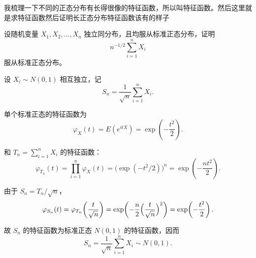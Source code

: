 \begin{dxtips}
    我梳理一下不同的正态分布有长得很像的特征函数，所以叫特征函数。然后这里就是求特征函数然后证明长正态分布特征函数该有的样子
\end{dxtips}
\begin{homework}[4.11]
设随机变量 $X_1,X_2,\ldots,X_n$ 独立同分布，且均服从标准正态分布，证明
\[
n^{-1/2}\sum_{i=1}^n X_i
\]
服从标准正态分布。
\end{homework}
\begin{solution}
设 $X_i\sim N(0,1)$ 相互独立，记
\[
S_n=\frac1{\sqrt{n}}\sum_{i=1}^n X_i.
\]

单个标准正态的特征函数为
\[
\varphi_X(t)=E(e^{itX})=\exp\!\left(-\frac{t^2}{2}\right).
\]

和 $T_n=\sum_{i=1}^n X_i$ 的特征函数：
\[
\varphi_{T_n}(t)
=\prod_{i=1}^n \varphi_X(t)
=\bigl(\exp(-t^2/2)\bigr)^n
=\exp\!\left(-\frac{n t^2}{2}\right).
\]

由于 $S_n = T_n/\sqrt{n}$，
\[
\varphi_{S_n}(t)
=\varphi_{T_n}\!\left(\frac{t}{\sqrt{n}}\right)
=\exp\!\left(-\frac{n}{2}\Bigl(\frac{t}{\sqrt{n}}\Bigr)^2\right)
=\exp\!\left(-\frac{t^2}{2}\right).
\]

故 $S_n$ 的特征函数为标准正态 $N(0,1)$ 的特征函数，因而
\[
\boxed{S_n=\frac1{\sqrt{n}}\sum_{i=1}^n X_i \sim N(0,1).}
\]
\end{solution}

